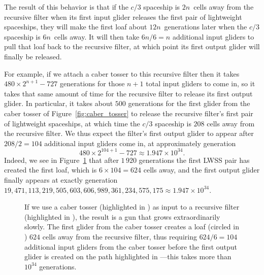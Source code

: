 
The result of this behavior is that if the $c/3$ spaceship is $2n$~cells away from the recursive filter when its first input glider releases the first pair of lightweight spaceships, they will make the first loaf about $12n$~generations later when the $c/3$ spaceship is $6n$~cells away. It will then take $6n/6 = n$ additional input gliders to pull that loaf back to the recursive filter, at which point its first output glider will finally be released.

For example, if we attach a caber tosser to this recursive filter then it takes $480 \times 2^{n+1} - 727$ generations for those $n+1$ total input gliders to come in, so it takes that same amount of time for the recursive filter to release its first output glider. In particular, it takes about $500$ generations for the first glider from the caber tosser of Figure~\ref{fig:caber_tosser} to release the recursive filter's first pair of lightweight spaceships, at which time the $c/3$ spaceship is $208$ cells away from the recursive filter. We thus expect the filter's first output glider to appear after $208/2 = 104$ additional input gliders come in, at approximately generation
\[
	480 \times 2^{104 + 1} - 727 \approx 1.947 \times 10^{34}.
\]
Indeed, we see in Figure~\ref{fig:recursive_filter_caber} that after $1\, 920$ generations the first LWSS pair has created the first loaf, which is $6 \times 104 = 624$ cells away, and the first output glider finally appears at exactly generation $19,471,113,219,505,603,606,989,361,234,575,175 \approx 1.947 \times 10^{34}$.

\begin{figure}[!htb]
	\centering
	\caption{If we use a caber tosser (highlighted in ) as input to a recursive filter (highlighted in ), the result is a gun that grows extraordinarily slowly. The first glider from the caber tosser creates a loaf (circled in ) $624$ cells away from the recursive filter, thus requiring $624/6 = 104$ additional input gliders from the caber tosser before the first output glider is created on the path highlighted in ---this takes more than $10^{34}$ generations.}\label{fig:recursive_filter_caber}
\end{figure}

